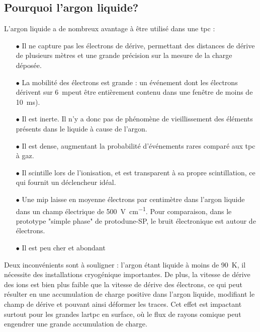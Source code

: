     \subsection{Pourquoi l'argon liquide?}
      L'argon liquide a de nombreux avantage à être utilisé dans une \gls{tpc}\cite{Rubbia1977} :
      \begin{itemize}
        \item[$\bullet$] Il ne capture pas les électrons de dérive, permettant des distances de dérive de plusieurs mètres et une grande précision sur la mesure de la charge déposée.
        \item[$\bullet$] La mobilité des électrons est grande : un événement dont les électrons dérivent sur \SI{6}{\meter}peut être entièrement contenu dans une fenêtre de moins de \SI{10}{\milli\second}).
        \item[$\bullet$] Il est inerte. Il n'y a donc pas de phénomène de vieillissement des éléments présents dans le liquide à cause de l'argon.
        \item[$\bullet$] Il est dense, augmentant la probabilité d'événements rares comparé aux \gls{tpc} à gaz.
        \item[$\bullet$] Il scintille lors de l'ionisation, et est transparent à sa propre scintillation, ce qui fournit un déclencheur idéal.
        \item[$\bullet$] Une \gls{mip} laisse en moyenne  électrons par centimètre dans l'argon liquide dans un champ électrique de \SI{500}{\volt\per\centi\meter}. Pour comparaison, dans le prototype "simple phase" de proto\gls{dune}-SP, le bruit électronique est autour de  électrons.
        \item[$\bullet$] Il est peu cher et abondant
      \end{itemize}
      Deux inconvénients sont à souligner : l'argon étant liquide à moins de \SI{90}{\kelvin}, il nécessite des installations cryogénique importantes. De plus, la vitesse de dérive des ions est bien plus faible que la vitesse de dérive des électrons, ce qui peut résulter en une accumulation de charge positive dans l'argon liquide, modifiant le champ de dérive et pouvant ainsi déformer les traces. Cet effet est impactant surtout pour les grandes \gls{lartpc} en surface, où le flux de rayons comique peut engendrer une grande accumulation de charge.
    
